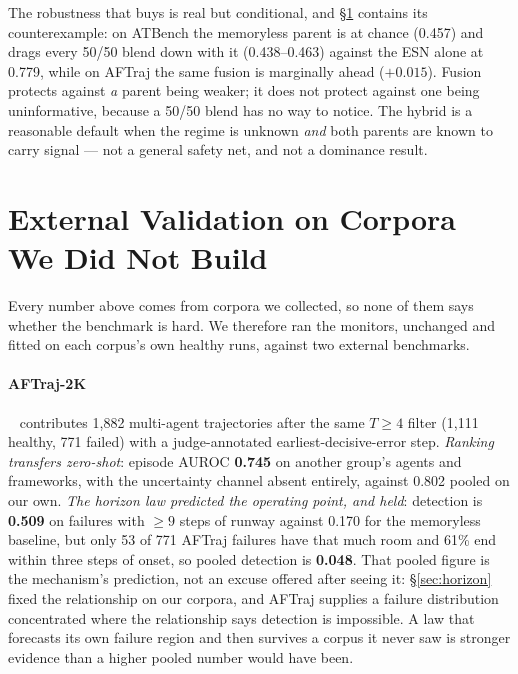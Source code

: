 \documentclass{article}
\begin{document}
The robustness that buys is real but conditional, and \S\ref{sec:external}
contains its counterexample: on ATBench the memoryless parent is at chance
(0.457) and drags every 50/50 blend down with it (0.438--0.463) against the ESN
alone at 0.779, while on AFTraj the same fusion is marginally ahead ($+0.015$).
Fusion protects against \emph{a} parent being weaker; it does not protect
against one being uninformative, because a 50/50 blend has no way to notice.
The hybrid is a reasonable default when the regime is unknown \emph{and} both
parents are known to carry signal --- not a general safety net, and not a
dominance result.

\section{External Validation on Corpora We Did Not Build}
\label{sec:external}

Every number above comes from corpora we collected, so none of them says
whether the benchmark is hard. We therefore ran the monitors, unchanged and
fitted on each corpus's own healthy runs, against two external benchmarks.

\paragraph{AFTraj-2K}~\cite{zhang2026agentforesight} contributes 1{,}882
multi-agent trajectories after the same $T\ge4$ filter (1{,}111 healthy, 771
failed) with a judge-annotated earliest-decisive-error step. \emph{Ranking
transfers zero-shot}: episode AUROC \textbf{0.745} on another group's agents and
frameworks, with the uncertainty channel absent entirely, against 0.802 pooled
on our own. \emph{The horizon law predicted the operating point, and held}:
detection is \textbf{0.509} on failures with $\ge9$ steps of runway against
0.170 for the memoryless baseline, but only 53 of 771 AFTraj failures have that
much room and 61\% end within three steps of onset, so pooled detection is
\textbf{0.048}. That pooled figure is the mechanism's prediction, not an excuse
offered after seeing it: \S\ref{sec:horizon} fixed the relationship on our
corpora, and AFTraj supplies a failure distribution concentrated where the
relationship says detection is impossible. A law that forecasts its own failure
region and then survives a corpus it never saw is stronger evidence than a
higher pooled number would have been.
\end{document}
